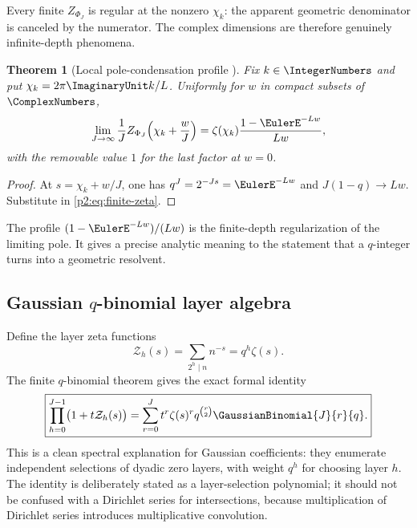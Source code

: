 \documentclass[11pt]{article}
\numberwithin{equation}{section}
\newtheorem{theorem}{Theorem}[section]
\theoremstyle{definition}
\theoremstyle{remark}
\begin{document}
Every finite $Z_{\Phi_J}$ is regular at the nonzero $\chi_k$: the apparent
geometric denominator is canceled by the numerator.  The complex dimensions are
therefore genuinely infinite-depth phenomena.

\begin{theorem}[Local pole-condensation profile \NewResult]
\label{p2:thm:condensation}
Fix $k\in\IntegerNumbers$ and put $\chi_k=2\pi\ImaginaryUnit k/L$.  Uniformly for $w$ in compact subsets
of $\ComplexNumbers$,
\begin{equation}
 \lim_{J\to\infty}\frac1J
 Z_{\Phi_J}\!\left(\chi_k+\frac{w}{J}\right)
 =\zeta(\chi_k)\frac{1-\EulerE^{-Lw}}{Lw},                     \label{p2:eq:condensation}
\end{equation}
with the removable value $1$ for the last factor at $w=0$.
\end{theorem}

\begin{proof}
At $s=\chi_k+w/J$, one has
$q^J=2^{-Js}=\EulerE^{-Lw}$ and
$J(1-q)\to Lw$.  Substitute in \eqref{p2:eq:finite-zeta}.
\end{proof}

The profile $(1-\EulerE^{-Lw})/(Lw)$ is the finite-depth regularization of the limiting
pole.  It gives a precise analytic meaning to the statement that a $q$-integer
turns into a geometric resolvent.

\subsection{Gaussian $q$-binomial layer algebra}

Define the layer zeta functions
\begin{equation}
 \mathcal Z_h(s)=\sum_{2^h\mid n}n^{-s}=q^h\zeta(s).        \label{p2:eq:layer-zeta}
\end{equation}
The finite $q$-binomial theorem gives the exact formal identity
\begin{equation}
 \boxed{
 \prod_{h=0}^{J-1}\bigl(1+t\mathcal Z_h(s)\bigr)
 =\sum_{r=0}^{J}t^r\zeta(s)^r q^{\binom r2}
   \GaussianBinomial{J}{r}{q}.}                                     \label{p2:eq:q-layer}
\end{equation}
This is a clean spectral explanation for Gaussian coefficients: they enumerate
independent selections of dyadic zero layers, with weight $q^h$ for choosing
layer $h$.  The identity is deliberately stated as a layer-selection polynomial;
it should not be confused with a Dirichlet series for intersections, because
multiplication of Dirichlet series introduces multiplicative convolution.
\end{document}
